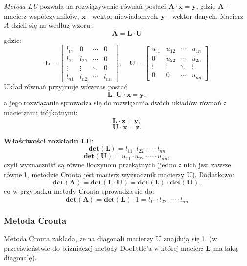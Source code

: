 \documentclass[a4paper]{article}
\begin{document}
\emph {Metoda LU} pozwala na rozwiązywanie równań postaci $\mathbf{A} \cdot \mathbf{x} = \mathbf{y}$, gdzie $\mathbf{A}$ - macierz współczynników, $\mathbf{x}$ - wektor niewiadomych, $\mathbf{y}$ - wektor danych.\newline
Macierz $A$ dzieli się na według wzoru : $$\mathbf{A} = \mathbf{L} \cdot \mathbf{U}$$ 
gdzie: 
\newline
        $$\mathbf{L} =
		\begin{bmatrix}
		l_{11} & 0      & \cdots & 0 \\
		l_{21} & l_{22} & \cdots & 0 \\
		\vdots & \vdots & \ddots & 0 \\
		l_{n1} & l_{n2} & \cdots & l_{nn}
		\end{bmatrix},\quad 		
	      \mathbf{U} = 
		\begin{bmatrix}
		u_{11} & u_{12} & \cdots & u_{1n} \\
		0      & u_{22} & \cdots & u_{2n} \\
		\vdots & \vdots & \ddots & \vdots \\
		0      & 0      & \cdots & u_{nn}
		\end{bmatrix}$$
Układ równań przyjmuje wówczas postać
$$\mathbf{L} \cdot \mathbf{U} \cdot \mathbf{x} = \mathbf{y},$$\newline
a jego rozwiązanie sprowadza się do rozwiązania dwóch układów równań z macierzami trójkątnymi:
$$\mathbf{L} \cdot \mathbf{z} = \mathbf{y},$$
$$\mathbf{U} \cdot \mathbf{x} = \mathbf{z}.$$

\textbf{Właściwości rozkładu LU:}
$$\mathbf{det(L)} = l_{11} \cdot l_{22} \cdot \cdots \cdot l_{nn}$$
$$\mathbf{det(U)} = u_{11} \cdot u_{22} \cdot \cdots \cdot u_{nn},$$
 czyli wyznaczniki są równe iloczynom przekątnych (jedno z nich jest zawsze równe 1, metodzie Croota jest macierz wyznacznik macierzy U).
 \newline
 Dodatkowo:
 $$\mathbf{det(A)}=\mathbf{det(L \cdot \mathbf U)}=\mathbf{det(L)} \cdot \mathbf{det(U)},$$
 co w przypadku metody Crouta sprowadza sie do:
 $$\mathbf{det(A)}= \mathbf{det(L)} \cdot 1 = l_{11} \cdot l_{22} \cdot \cdots \cdot l_{nn}$$

\subsubsection*{Metoda Crouta}
Metoda Crouta zakłada, że na diagonali macierzy $\mathbf{U}$ znajdują się 1. (w przeciwieństwie do bliźniaczej metody Doolittle'a w której macierz $\mathbf{L}$ ma taką diagonalę).
\end{document}
